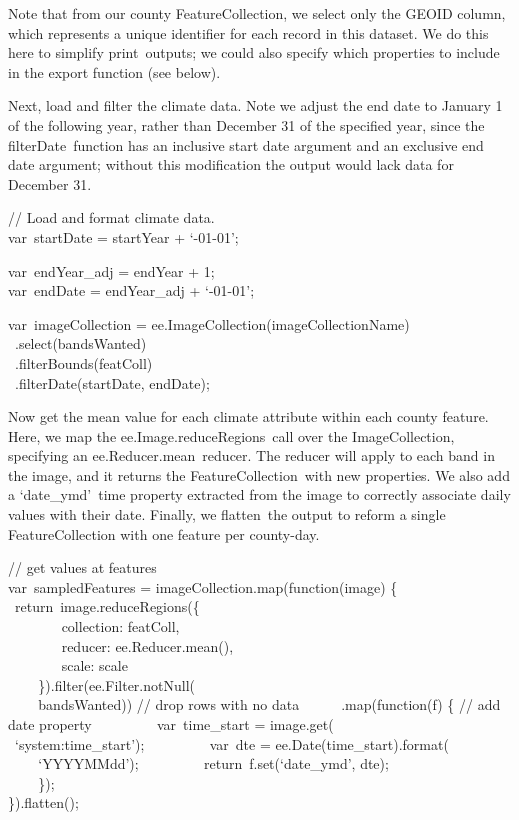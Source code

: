 \documentclass[
  letterpaper,
  DIV=11,
  numbers=noendperiod]{scrreprt}
\begin{document}
Note that from our county FeatureCollection, we select only the GEOID
column, which represents a unique identifier for each record in this
dataset. We do this here to simplify print~outputs; we could also
specify which properties to include in the export function (see below).

Next, load and filter the climate data. Note we adjust the end date to
January 1 of the following year, rather than December 31 of the
specified year, since the filterDate~function has an inclusive start
date argument and an exclusive end date argument; without this
modification the output would lack data for December 31.

// Load and format climate data.\\
var~startDate = startYear + `-01-01';

var~endYear\_adj = endYear + 1;\\
var~endDate = endYear\_adj + `-01-01';

var~imageCollection = ee.ImageCollection(imageCollectionName)\\
\hspace*{0.333em} ~.select(bandsWanted)\\
\hspace*{0.333em} ~.filterBounds(featColl)\\
\hspace*{0.333em} ~.filterDate(startDate, endDate);

Now get the mean value for each climate attribute within each county
feature. Here, we map the ee.Image.reduceRegions~call over the
ImageCollection, specifying an ee.Reducer.mean~reducer. The reducer will
apply to each band in the image, and it returns the
FeatureCollection~with new properties. We also add a `date\_ymd'~time
property extracted from the image to correctly associate daily values
with their date. Finally, we flatten~the output to reform a single
FeatureCollection with one feature per county-day.

// get values at features\\
var~sampledFeatures = imageCollection.map(function(image) \{~
~return~image.reduceRegions(\{\\
\hspace*{0.333em} ~ ~ ~ ~ ~collection: featColl,\\
\hspace*{0.333em} ~ ~ ~ ~ ~reducer: ee.Reducer.mean(),\\
\hspace*{0.333em} ~ ~ ~ ~ ~scale: scale\\
\hspace*{0.333em} ~ ~ ~\}).filter(ee.Filter.notNull(\\
\hspace*{0.333em} ~ ~ ~bandsWanted)) // drop rows with no data~ ~ ~
~.map(function(f) \{ // add date property~ ~ ~ ~ ~ ~var~time\_start =
image.get(~ ~ ~ ~ ~ ~ ~ ~`system:time\_start');~ ~ ~ ~ ~ ~var~dte =
ee.Date(time\_start).format(~ ~ ~ ~ ~ ~ ~ ~`YYYYMMdd');~ ~ ~ ~ ~
~return~f.set(`date\_ymd', dte);\\
\hspace*{0.333em} ~ ~ ~\});\\
\}).flatten();
\end{document}
